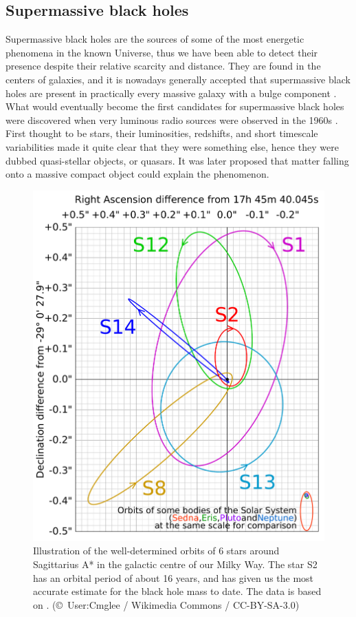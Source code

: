 \documentclass[english, oneside]{HYgradu}
\begin{document}
\subsection{Supermassive black holes}

Supermassive black holes are the sources of some of the most energetic phenomena in the known Universe, thus we have been able to detect their presence despite their relative scarcity and distance. They are found in the centers of galaxies, and it is nowadays generally accepted that supermassive black holes are present in practically every massive galaxy with a bulge component \citep{kormendy:2013}. What would eventually become the first candidates for supermassive black holes were discovered when very luminous radio sources were observed in the 1960s \citep{greenstein:1964}. First thought to be stars, their luminosities, redshifts, and short timescale variabilities made it quite clear that they were something else, hence they were dubbed quasi-stellar objects, or quasars. It was later proposed that matter falling onto a massive compact object could explain the phenomenon.

\begin{figure}[h!tb]
\centering
\includegraphics[width=\textwidth]{../images/MilkyWaySMBH.pdf}
\caption{Illustration of the well-determined orbits of 6 stars around Sagittarius A* in the galactic centre of our Milky Way. The star S2 has an orbital period of about 16 years, and has given us the most accurate estimate for the black hole mass to date. The data is based on \cite{eisenhauer:2005}.
(\copyright \ User:Cmglee / Wikimedia Commons / CC-BY-SA-3.0)}
\label{fig:MilkyWayBH}
\end{figure}
\end{document}
